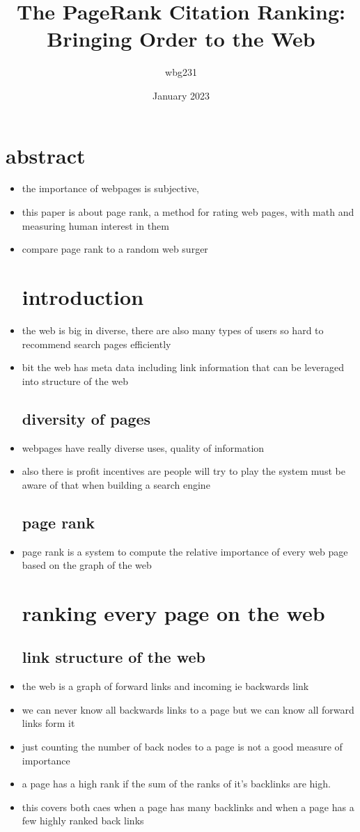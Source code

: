 \documentclass{article}
\title{The PageRank Citation Ranking:
Bringing Order to the Web }
\author{wbg231 }
\date{January 2023}
\begin{document}
\maketitle

\section{abstract}
\begin{itemize}
\item the importance of webpages is subjective,
\item this paper is about page rank, a method for rating web pages, with math and measuring human interest in them 
\item compare page rank to a random web surger
\section*{introduction}
\item the web is big in diverse, there are also many types of users so hard to recommend search pages efficiently
\item bit the web has meta data including link information that can be leveraged into structure of the web
\subsection*{diversity of pages}
\item webpages have really diverse uses, quality of information
\item also there is profit incentives are people will try to play the system must be aware of that when building a search engine 
\subsection*{page rank}
\item page rank is a system to compute the relative importance of every web page based on the graph of the web 

\section*{ranking every page on the web }
\subsection*{link structure of the web}

\item the web is a graph of forward links and incoming ie backwards link 
\item we can never know all backwards links to a page but we can know all forward links form it 
\item just counting the number of back nodes to a page is not a good measure of importance
\item a page has a high rank if the sum of the ranks of it's backlinks are high. 
\item this covers both caes when a page has many backlinks and when a page has a few highly ranked back links 

\end{itemize}
\end{document}
